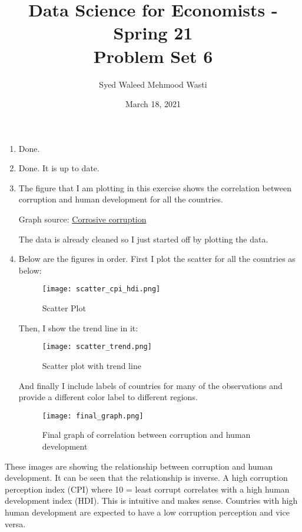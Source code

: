 \documentclass[12pt]{article}
\title{\textbf{Data Science for Economists - Spring 21 \\
\vspace{0.5cm}
Problem Set 6}}
\author{Syed Waleed Mehmood Wasti}
\date{March 18, 2021}
\begin{document}
\begin{titlepage}
\maketitle
\thispagestyle{empty}
\end{titlepage}

\begin{enumerate}
\item
Done. 

\item
Done. It is up to date. 

\item
The figure that I am plotting in this exercise shows the correlation between corruption and human development for all the countries. 

Graph source: \href{http://www.economist.com/node/21541178}{Corrosive corruption}

The data is already cleaned so I just started off by plotting the data. 

\item

Below are the figures in order. First I plot the scatter for all the countries as below: 

\begin{figure}[H]
    \centering
    \texttt{[image: scatter\_cpi\_hdi.png]}
    \caption{Scatter Plot}
    \label{fig:scatter}
\end{figure}


Then, I show the trend line in it: 

\begin{figure}[H]
    \centering
    \texttt{[image: scatter\_trend.png]}
    \caption{Scatter plot with trend line}
    \label{fig:scatter_trend}
\end{figure}


And finally I include labels of countries for many of the observations and provide a different color label to different regions. 


\begin{figure}[H]
    \centering
    \texttt{[image: final\_graph.png]}
    \caption{Final graph of correlation between corruption and human development}
    \label{fig:final}
\end{figure}


\end{enumerate}


These images are showing the relationship between corruption and human development. It can be seen that the relationship is inverse. A high corruption perception index (CPI) where 10 = least corrupt correlates with a high human development index (HDI). This is intuitive and makes sense. Countries with high human development are expected to have a low corruption perception and vice versa. 
\end{document}
